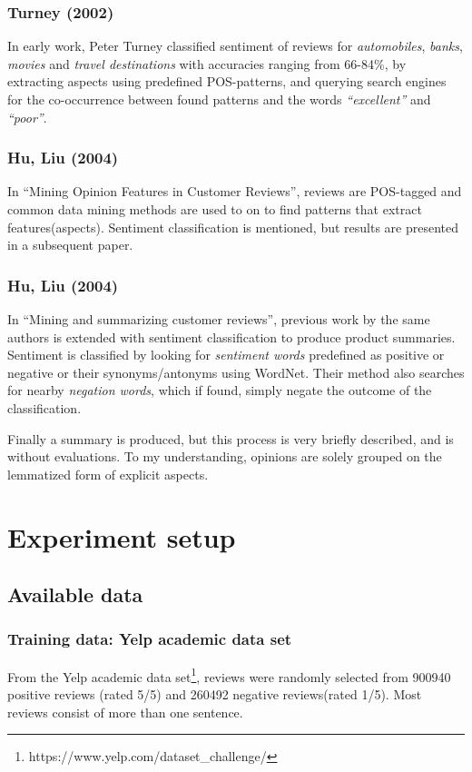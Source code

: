 \documentclass[a4paper,11pt]{kth-mag}
\begin{document}
\subsubsection{Turney (2002)}
In early work, Peter Turney classified sentiment of reviews for \emph{automobiles}, \emph{banks}, \emph{movies} and \emph{travel destinations} with accuracies ranging from 66-84\%, by extracting aspects using predefined POS-patterns, and querying search engines for the co-occurrence between found patterns and the words \emph{``excellent''} and \emph{``poor''}.

\subsubsection{Hu, Liu (2004)}
In ``Mining Opinion Features in Customer Reviews'', reviews are POS-tagged and common data mining methods are used to on to find patterns that extract features(aspects). Sentiment classification is mentioned, but results are presented in a subsequent paper.

\subsubsection{Hu, Liu (2004)}
In ``Mining and summarizing customer reviews'', previous work by the same authors is extended with sentiment classification to produce product summaries. Sentiment is classified by looking for \emph{sentiment words} predefined as positive or negative or their synonyms/antonyms using WordNet. Their method also searches for nearby \emph{negation words}, which if found, simply negate the outcome of the classification.

Finally a summary is produced, but this process is very briefly described, and is without evaluations. To my understanding, opinions are solely grouped on the lemmatized form of explicit aspects.


\pagebreak
\section{Experiment setup}

\subsection{Available data}

\subsubsection{Training data: Yelp academic data set}
From the Yelp academic data set\footnote{https://www.yelp.com/dataset\_challenge/},
reviews were randomly selected from 900940 positive reviews (rated 5/5)
and 260492 negative reviews(rated 1/5). Most reviews consist of more than one sentence.
\end{document}
